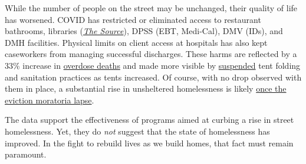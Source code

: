 \documentclass[11pt]{article}
\begin{document}
While the number of people on the street may be unchanged, their quality of life has worsened. 
COVID has restricted or eliminated access to restaurant bathrooms, libraries 
(\href{https://www.lapl.org/homeless-resources/the-source}{\it The Source}), DPSS 
(EBT, Medi-Cal), DMV (IDs), and DMH facilities. Physical limits on client access at 
hospitals has also kept caseworkers from managing successful discharges. These harms 
are reflected by a 33\% increase in 
\href{http://publichealth.lacounty.gov/chie/reports/HomelessMortality2020_CHIEBrief_Final.pdf}{overdose deaths} and made more visible by \href{https://clkrep.lacity.org/onlinedocs/2020/20-0147_misc_3-17-20_p.pdf}{suspended}
tent folding and sanitation practices as tents increased.
Of course, with no drop observed with them in place, a substantial rise in unsheltered homelessness
is likely \href{https://www.latimes.com/california/story/2021-01-12/new-report-foresees-tens-of-thousands-losing-homes-by-2023}{once the eviction moratoria lapse}.

The data support the effectiveness of programs aimed at curbing a rise in street homelessness.
Yet, they do {\it not} suggest that the state of homelessness has improved. In the fight to rebuild 
lives as we build homes, that fact must remain paramount.

\end{document}
